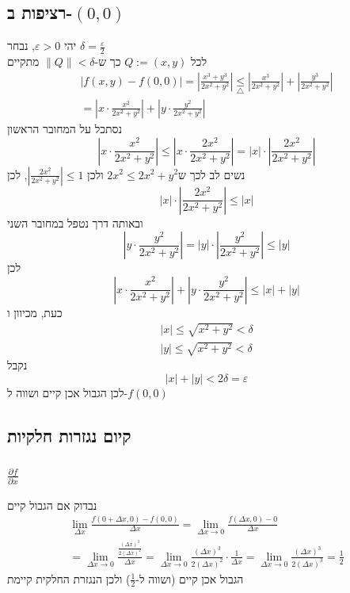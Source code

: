 \documentclass[12pt, titlepage]{article}
\newcommand{\pard}[2][f]{\frac{\partial #1}{\partial #2}}
\begin{document}
\subsection*{רציפות ב-$\left(0,0\right)$}
יהי $\varepsilon >0$, נבחר $\delta = \frac{\varepsilon}{2}$\\
לכל $Q:=\left(x,y\right)$ כך ש-$\lVert Q \rVert < \delta$ מתקיים
\begin{gather*}
    \left|f\left(x,y\right) - f\left(0,0\right)\right| = \left|\frac{x^3 + y^3}{2x^2 +y^2}\right| \underset{\triangle}{\leq} \left|\frac{x^3}{2x^2 + y^2}\right| + \left|\frac{y^3}{2x^2+y^2}\right| \\
    = \left|x \cdot \frac{x^2}{2x^2 + y^2}\right| + \left|y\cdot\frac{y^2}{2x^2+y^2}\right| 
\end{gather*}
נסתכל על המחובר הראשון
\[
    \left|x\cdot \frac{x^2}{2x^2+y^2}\right| \leq \left|x\cdot \frac{2x^2}{2x^2+y^2}\right| = \left|x\right| \cdot \left|\frac{2x^2}{2x^2 + y^2}\right|
\]
נשים לב לכך ש$2x^2 \leq 2x^2 + y^2$ ולכן $\left|\frac{2x^2}{2x^2+y^2}\right|\leq 1$, לכן
\[
\left|x\right| \cdot \left|\frac{2x^2}{2x^2 + y^2}\right| \leq \left|x\right|
\]
ובאותה דרך נטפל במחובר השני
\[
    \left|y\cdot \frac{y^2}{2x^2+y^2}\right| = \left|y\right| \cdot \left|\frac{y^2}{2x^2 + y^2}\right| \leq \left|y\right|
\]
לכן
\[
    \left|x \cdot \frac{x^2}{2x^2+y^2}\right| + \left|y\cdot \frac{y^2}{2x^2+y^2}\right| \leq \left|x\right| + \left|y\right|
\]
כעת, מכיוון ו
\begin{gather*}
    \left|x\right| \leq \sqrt{x^2+y^2} < \delta\\
    \left|y\right| \leq \sqrt{x^2+y^2} < \delta
\end{gather*}
נקבל
\[
    \left|x\right| + \left|y\right| < 2\delta = \varepsilon
\]
לכן הגבול אכן קיים ושווה ל-$f\left(0,0\right)$
\subsection*{קיום נגזרות חלקיות}
\subsubsection*{$\pard{x}$}
נבדוק אם הגבול קיים
\begin{gather*}
    \lim_{\Delta x} \frac{f\left(0+\Delta x,0\right) - f\left(0,0\right)}{\Delta x} = \lim_{\Delta x\to 0} \frac{f\left(\Delta x,0\right) - 0}{\Delta x} \\
    = \lim_{\Delta x\to0} \frac{\frac{\left(\Delta x\right)^3}{2\left(\Delta x\right)^2}}{\Delta x } = \lim_{\Delta x\to 0}\frac{\left(\Delta x\right)^3}{2\left(\Delta x\right)^2} \cdot \frac{1}{\Delta x} = \lim_{\Delta x\to 0} \frac{\left(\Delta x\right)^3}{2\left(\Delta x\right)^3} = \frac{1}{2}
\end{gather*}
הגבול אכן קיים (ושווה ל-$\frac{1}{2}$) ולכן הנגזרת החלקית קיימת
\end{document}
